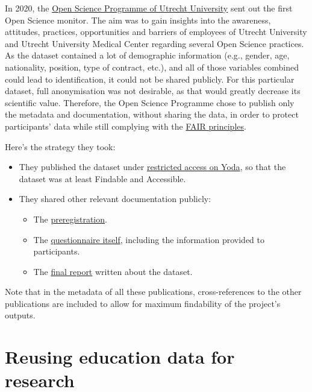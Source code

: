 \documentclass[
]{book}
\providecommand{\tightlist}{%
  \setlength{\itemsep}{0pt}\setlength{\parskip}{0pt}}
\begin{document}
In 2020, the \href{https://www.uu.nl/en/research/open-science}{Open Science Programme of Utrecht University}
sent out the first
Open Science monitor. The aim was to gain insights into the awareness,
attitudes, practices, opportunities and barriers of employees of Utrecht
University and Utrecht University Medical Center regarding several Open
Science practices. As the dataset contained a lot of demographic information
(e.g., gender, age, nationality, position, type of contract, etc.), and all of
those variables combined could lead to identification, it could not be shared
publicly. For this particular dataset, full anonymisation was not desirable,
as that would greatly decrease its scientific value. Therefore, the Open Science
Programme chose to publish only the metadata and documentation, without sharing
the data, in order to protect participants' data while still complying with the
\href{https://www.uu.nl/en/research/research-data-management/guides/how-to-make-your-data-fair}{FAIR principles}.

Here's the strategy they took:

\begin{itemize}
\tightlist
\item
  They published the dataset under
  \href{https://doi.org/10.24416/UU01-3L9K99}{restricted access on Yoda},
  so that the dataset was at least Findable and Accessible.
\item
  They shared other relevant documentation publicly:

  \begin{itemize}
  \tightlist
  \item
    The \href{https://doi.org/10.5281/zenodo.5727106}{preregistration}.
  \item
    The \href{https://doi.org/10.5281/zenodo.5727057}{questionnaire itself},
    including the information provided to participants.
  \item
    The \href{https://doi.org/10.5281/zenodo.5725177}{final report}
    written about the dataset.
  \end{itemize}
\end{itemize}

Note that in the metadata of all these publications, cross-references to the
other publications are included to allow for maximum findability of the
project's outputs.

\hypertarget{reuse-education-data}{%
\chapter{Reusing education data for research}\label{reuse-education-data}}
\end{document}
